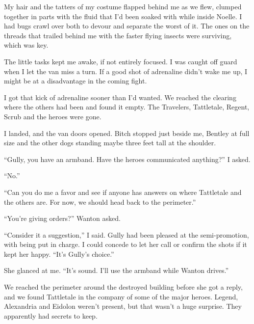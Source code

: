 My hair and the tatters of my costume flapped behind me as we flew, clumped together in parts with the fluid that I'd been soaked with while inside Noelle.  I had bugs crawl over both to devour and separate the worst of it.  The ones on the threads that trailed behind me with the faster flying insects were surviving, which was key.



The little tasks kept me awake, if not entirely focused. I was caught off guard when I let the van miss a turn.  If a good shot of adrenaline didn't wake me up, I might be at a disadvantage in the coming fight.



I got that kick of adrenaline sooner than I'd wanted.  We reached the clearing where the others had been and found it empty.  The Travelers, Tattletale, Regent, Scrub and the heroes were gone.



I landed, and the van doors opened.  Bitch stopped just beside me, Bentley at full size and the other dogs standing maybe three feet tall at the shoulder.



``Gully, you have an armband.  Have the heroes communicated anything?''  I asked.



``No.''



``Can you do me a favor and see if anyone has answers on where Tattletale and the others are.  For now, we should head back to the perimeter.''



``You're giving orders?'' Wanton asked.



``Consider it a suggestion,'' I said.  Gully had been pleased at the semi-promotion, with being put in charge.  I could concede to let her call or confirm the shots if it kept her happy.  ``It's Gully's choice.''



She glanced at me.  ``It's sound.  I'll use the armband while Wanton drives.''



We reached the perimeter around the destroyed building before she got a reply, and we found Tattletale in the company of some of the major heroes.  Legend, Alexandria and Eidolon weren't present, but that wasn't a huge surprise.  They apparently had secrets to keep.



